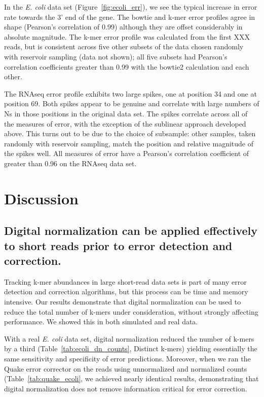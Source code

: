\documentclass{article}
\begin{document}
In the {\em E. coli} data set (Figure~\ref{fig:ecoli_err}), we see the
typical increase in error rate towards the 3' end of the gene.  The
bowtie and k-mer error profiles agree in shape (Pearson's correlation
of 0.99) although they are offset considerably in absolute magnitude.
The k-mer error profile was calculated from the first XXX reads, but
is consistent across five other subsets of the data chosen randomly
with reservoir sampling (data not shown); all five subsets had
Pearson's correlation coefficients greater than 0.99 with the bowtie2
calculation and each other.

The RNAseq error profile exhibits two large spikes, one at position 34
and one at position 69.  Both spikes appear to be genuine and
correlate with large numbers of Ns in those positions in the original
data set.  The spikes correlate across all of the measures of error,
with the exception of the sublinear approach developed above.  This
turns out to be due to the choice of subsample: other samples, taken
randomly with reservoir sampling, match the position and relative magnitude
of the spikes well.  All measures of error have a Pearson's correlation
coefficient of greater than 0.96 on the RNAseq data set.

\section{Discussion}

\subsection{Digital normalization can be applied effectively to short reads prior to error detection and correction.}

Tracking k-mer abundances in large short-read data sets is part of
many error detection and correction algorithms, but this process can
be time and memory intensive.  Our results demonstrate that digital
normalization can be used to reduce the total number of k-mers under
consideration, without strongly affecting performance.  We showed
this in both simulated and real data.

With a real {\em E. coli} data set, digital normalization reduced the
number of k-mers by a third (Table~\ref{tab:ecoli_dn_counts}, Distinct
k-mers) yielding essentially the same sensitivity and specificity of
error predictions.  Moreover, when we ran the Quake error corrector on
the reads using unnormalized and normalized counts
(Table~\ref{tab:quake_ecoli}, we achieved nearly identical results,
demonstrating that digital normalization does not remove information
critical for error correction.
\end{document}

